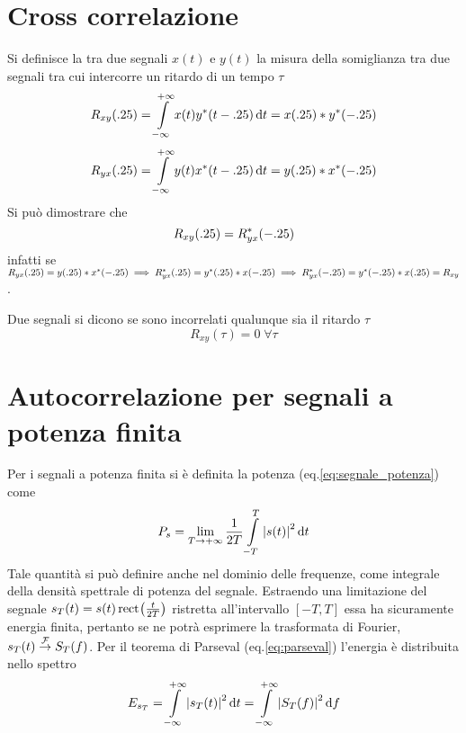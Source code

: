 \section{Cross correlazione}
Si definisce la  tra due segnali $x(t)$ e $y(t)$ la misura della somiglianza tra due segnali tra cui intercorre un ritardo di un tempo $\tau$
\begin{equation}R_{xy}(.25)=\int\limits_{-\infty}^{+\infty}{x(t){y}^\ast(t-.25)}{\,\mathop{}\!\mathrm{d}{t}}=x(.25)\ast {y}^\ast(-.25)\end{equation}
\begin{equation}R_{yx}(.25)=\int\limits_{-\infty}^{+\infty}{y(t){x}^\ast(t-.25)}{\,\mathop{}\!\mathrm{d}{t}}=y(.25)\ast {x}^\ast(-.25)\end{equation}
Si può dimostrare che \[R_{xy}(.25)=R_{yx}^\ast(-.25)\] infatti se $R_{yx}(.25)=y(.25)\ast {x}^\ast(-.25)\implies R_{yx}^\ast(.25)={y}^\ast(.25)\ast x(-.25)\implies
R_{yx}^\ast(-.25)={y}^\ast(-.25)\ast x(.25)=R_{xy}$.

Due segnali si dicono  se sono incorrelati qualunque sia il ritardo $\tau$ \[R_{xy}(\tau)=0\;\forall\tau\]

\section{Autocorrelazione per segnali a potenza finita}
Per i segnali a potenza finita si è definita la potenza (eq.\ref{eq:segnale_potenza}) come \[P_s=\lim\limits_{T\to+\infty}{\frac{1}{2T}\int\limits_{-T}^{T}{\left|{s(t)}\right|^2}{\,\mathop{}\!\mathrm{d}{t}}}\]
Tale quantità si può definire anche nel dominio delle frequenze, come integrale della densità spettrale di potenza del segnale. Estraendo una limitazione del segnale $s_T(t)=s(t)\,{\operatorname{rect}}^{}\!\left({\frac{t}{2T}}\right)$ ristretta all'intervallo $[-T,T]$ essa ha sicuramente energia finita, pertanto se ne potrà esprimere la trasformata di Fourier, $s_T(t)\overset{\operatorname{\mathcal{F}}}{\to}S_T(f)$. Per il teorema di Parseval (eq.\ref{eq:parseval}) l'energia è distribuita nello spettro 
\[E_{s_T}=\int\limits_{-\infty}^{+\infty}{\left|{s_T(t)}\right|^2}{\,\mathop{}\!\mathrm{d}{t}}=\int\limits_{-\infty}^{+\infty}{\left|{S_T(f)}\right|^2}{\,\mathop{}\!\mathrm{d}{f}}\]

